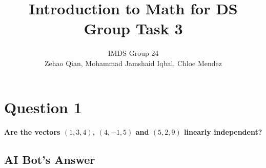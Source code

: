 \documentclass[11pt]{article} %
\title{Introduction to Math for DS Group Task 3}
\author{IMDS Group 24 \\ Zehao Qian, Mohammad Jamshaid Iqbal, Chloe Mendez}
\begin{document}
\maketitle
% 
% 
% 
\section{Question 1}

\paragraph{Are the vectors $(1,3,4)$, $(4,-1,5)$ and $(5,2,9)$ linearly independent?}


\subsection{AI Bot's Answer}
\end{document}
